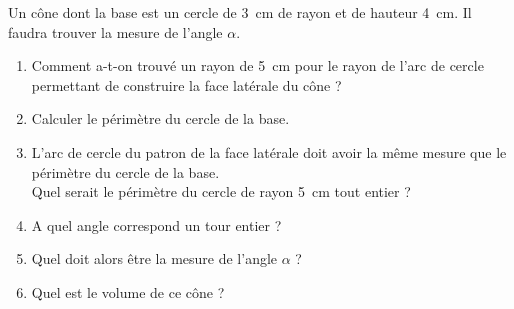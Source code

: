 
Un cône dont la base est un cercle de 3~cm de rayon et de hauteur 4~cm. Il faudra trouver la mesure de l'angle $\alpha$.
\begin{enumerate}
\item Comment a-t-on trouvé un rayon de 5~cm pour le rayon de l'arc de
	cercle permettant de construire la face latérale du cône ?

\item Calculer le périmètre du cercle de la base.

\item L'arc de cercle du patron de la face latérale doit avoir
la même mesure que le périmètre du cercle de la base.\\
Quel serait le périmètre du cercle de rayon 5~cm tout entier ?

\item A quel angle correspond un tour entier ?

\item Quel doit alors être la mesure de l'angle $\alpha$ ?

\item Quel est le volume de ce cône ?
\end{enumerate}
